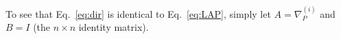 To see that Eq.~\eqref{eq:dir} is identical to Eq.~\eqref{eq:LAP}, 
simply let $A=\nabla_P^{(i)}$ and $B=I$ (the $n\times n$ identity matrix).



